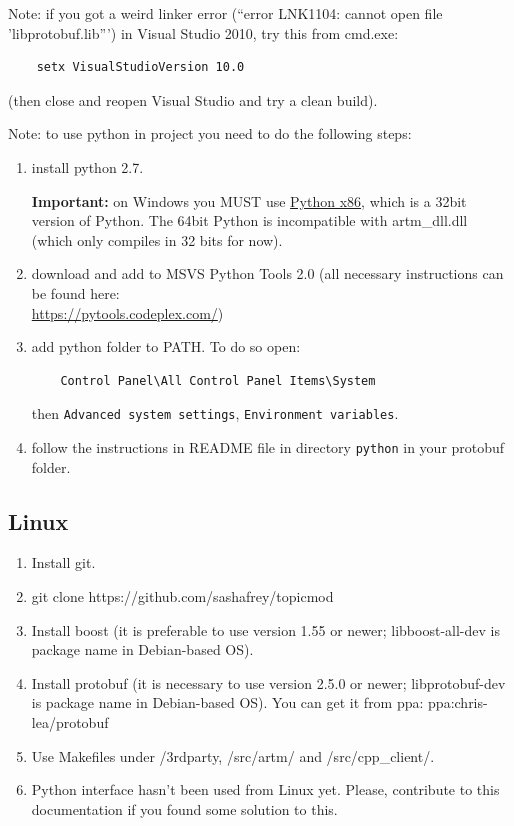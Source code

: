 \documentclass[11pt,a4paper,twoside]{report}
\begin{document}
Note: if you got a weird linker error (``error LNK1104: cannot open file 'libprotobuf.lib''')
      in Visual Studio 2010, try this from cmd.exe:
\begin{verbatim}
    setx VisualStudioVersion 10.0
\end{verbatim}
(then close and reopen Visual Studio and try a clean build).

Note: to use python in project you need to do the following steps:
\begin{enumerate}
	\item install python 2.7.

    {\bf Important:} on Windows you MUST use
    \href{https://www.python.org/ftp/python/2.7.6/python-2.7.6.msi}{Python x86},
    which is a 32bit version of Python. The 64bit Python is incompatible with artm\_dll.dll
    (which only compiles in 32 bits for now).
	\item download and add to MSVS Python Tools 2.0 (all necessary instructions can be found here: \\
	\url{https://pytools.codeplex.com/}) \\
	\item add python folder to PATH. To do so open:
\begin{verbatim}
    Control Panel\All Control Panel Items\System
\end{verbatim}
	then \verb'Advanced system settings', \verb'Environment variables'.
	\item follow the instructions in README file in directory \verb'python' in your protobuf folder.
\end{enumerate}

\subsection{Linux}

\begin{enumerate}
    \item Install git.
    \item git clone https://github.com/sashafrey/topicmod
    \item Install boost (it is preferable to use version 1.55 or newer; \hbox{libboost-all-dev} is package name in Debian-based OS).
    \item Install protobuf (it is necessary to use version 2.5.0 or newer; \hbox{libprotobuf-dev} is package name in Debian-based OS). You can get it from ppa: \hbox{ppa:chris-lea/protobuf}
    \item Use Makefiles under /3rdparty, /src/artm/ and /src/cpp\_client/.
    \item Python interface hasn't been used from Linux yet. Please, contribute to this documentation if you
    found some solution to this.
\end{enumerate}
\end{document}
